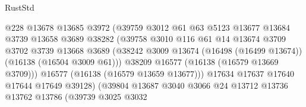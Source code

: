 \begin{lexlean}{RustStd}
\begin{coremodule}
                                      @228
                                      @13678
                                      @13685
                                      @3972
                                      (@39759
                                        @3012
                                        @61
                                        @63
                                        @5123
                                        @13677
                                        @13684
                                        @3739
                                        @13658
                                        @3689
                                        @38282
                                        (@39758
                                          @3010
                                          @116
                                          @61
                                          @14
                                          @13674
                                          @3709
                                          @3702
                                          @3739
                                          @13668
                                          @3689
                                          (@38242
                                            @3009
                                            @13674
                                            (@16498 (@16499 @13674))
                                            (@16138 (@16504 @3009 @61)))
                                          @38209
                                          @16577
                                          (@16138 (@16579 @13669 @3709)))
                                        @16577
                                        (@16138 (@16579 @13659 @13677)))
                                      @17634
                                      @17637
                                      @17640
                                      @17644
                                      @17649
                                      @39128)
                                    (@39804
                                      @13687
                                      @3040
                                      @3066
                                      @24
                                      @13712
                                      @13736
                                      @13762
                                      @13786
                                      (@39739
                                        @3025
                                        @3032

\end{coremodule}
\end{lexlean}

